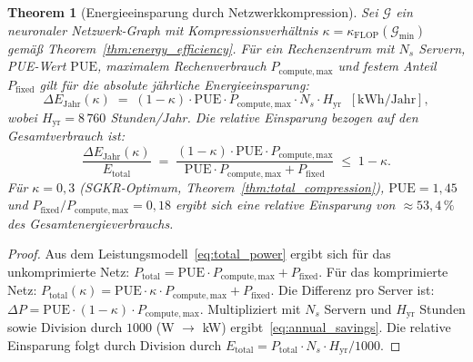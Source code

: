 \documentclass[12pt, a4paper, openany]{report}
\newtheorem{theorem}{Theorem}[chapter]
\newcommand{\calG}{\mathcal{G}}
\begin{document}
\begin{theorem}[Energieeinsparung durch Netzwerkkompression]
\label{thm:energy_savings}
Sei $\calG$ ein neuronaler Netzwerk-Graph mit Kompressionsverhältnis
$\kappa = \kappa_{\mathrm{FLOP}}(\calG_{\min})$ gemäß
Theorem~\ref{thm:energy_efficiency}.  Für ein Rechenzentrum mit
$N_s$ Servern, PUE-Wert $\mathrm{PUE}$, maximalem Rechenverbrauch
$P_{\mathrm{compute,max}}$ und festem Anteil $P_{\mathrm{fixed}}$ gilt für
die absolute jährliche Energieeinsparung:
\begin{equation}
  \label{eq:annual_savings}
  \Delta E_{\mathrm{Jahr}}(\kappa)
  \;=\;
  (1 - \kappa) \cdot \mathrm{PUE} \cdot P_{\mathrm{compute,max}} \cdot N_s \cdot H_{\mathrm{yr}}
  \;\;[\mathrm{kWh/Jahr}],
\end{equation}
wobei $H_{\mathrm{yr}} = 8\,760$ Stunden/Jahr.  Die \emph{relative Einsparung}
bezogen auf den Gesamtverbrauch ist:
\begin{equation}
  \label{eq:relative_savings}
  \frac{\Delta E_{\mathrm{Jahr}}(\kappa)}{E_{\mathrm{total}}}
  \;=\;
  \frac{(1-\kappa)\cdot\mathrm{PUE}\cdot P_{\mathrm{compute,max}}}
       {\mathrm{PUE}\cdot P_{\mathrm{compute,max}} + P_{\mathrm{fixed}}}
  \;\leq\; 1 - \kappa.
\end{equation}
Für $\kappa = 0{,}3$ (SGKR-Optimum, Theorem~\ref{thm:total_compression}),
$\mathrm{PUE} = 1{,}45$ und $P_{\mathrm{fixed}}/P_{\mathrm{compute,max}} = 0{,}18$
ergibt sich eine relative Einsparung von
$\approx 53{,}4\,\%$ des Gesamtenergieverbrauchs.
\end{theorem}

\begin{proof}
Aus dem Leistungsmodell~\eqref{eq:total_power} ergibt sich für das
unkomprimierte Netz:
$P_{\mathrm{total}} = \mathrm{PUE} \cdot P_{\mathrm{compute,max}} + P_{\mathrm{fixed}}$.
Für das komprimierte Netz:
$P_{\mathrm{total}}(\kappa) = \mathrm{PUE} \cdot \kappa \cdot P_{\mathrm{compute,max}} + P_{\mathrm{fixed}}$.
Die Differenz pro Server ist:
$\Delta P = \mathrm{PUE} \cdot (1-\kappa) \cdot P_{\mathrm{compute,max}}$.
Multipliziert mit $N_s$ Servern und $H_{\mathrm{yr}}$ Stunden sowie
Division durch $1000$ (W $\to$ kW) ergibt~\eqref{eq:annual_savings}.
Die relative Einsparung folgt durch Division durch
$E_{\mathrm{total}} = P_{\mathrm{total}} \cdot N_s \cdot H_{\mathrm{yr}} / 1000$.
\end{proof}
\end{document}
